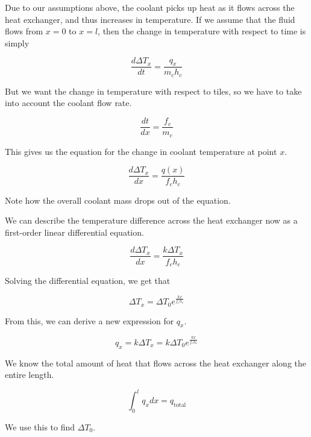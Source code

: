 \documentclass{article}
\numberwithin{equation}{subsection}
\theoremstyle{remark}
\newcommand{\qtotal}{q_{\mathrm{total}}}
\newcommand{\DeltaT}{\Delta{}T}
\begin{document}
Due to our assumptions above, the coolant picks up heat as it flows across the heat exchanger, and thus increases in temperature.
If we assume that the fluid flows from \(x = 0\) to \(x = l\), then the change in temperature with respect to time is simply

\begin{equation}
\frac{d\DeltaT_{x}}{dt} = \frac{q_{x}}{m_{c} h_{c}}
\end{equation}

But we want the change in temperature with respect to tiles, so we have to take into account the coolant flow rate.

\begin{equation}
\frac{dt}{dx} = \frac{f_{c}}{m_{c}}
\end{equation}

This gives us the equation for the change in coolant temperature at point \(x\).

\begin{equation}
\frac{d\DeltaT_{x}}{d x} = \frac{q \left(x\right)}{f_{c} h_{c}}
\end{equation}

Note how the overall coolant mass drops out of the equation.

We can describe the temperature difference across the heat exchanger now as a first-order linear differential equation.

\begin{equation}
\frac{d\DeltaT_{x}}{dx} = \frac{k \DeltaT_{x}}{f_{c} h_{c}}
\end{equation}

Solving the differential equation, we get that

\begin{equation}
\DeltaT_{x} = \DeltaT_{0} e^{\frac{k x}{f_{c} h_{c}}}
\end{equation}

From this, we can derive a new expression for \(q_{x}\).

\begin{equation}
q_{x} = k \DeltaT_{x} = k \DeltaT_{0} e^{\frac{k x}{f_{c} h_{c}}}
\end{equation}

We know the total amount of heat that flows across the heat exchanger along the entire length.

\begin{equation}
\int_{0}^{l} q_{x} dx = \qtotal
\end{equation}

We use this to find \(\DeltaT_{0}\).
\end{document}

